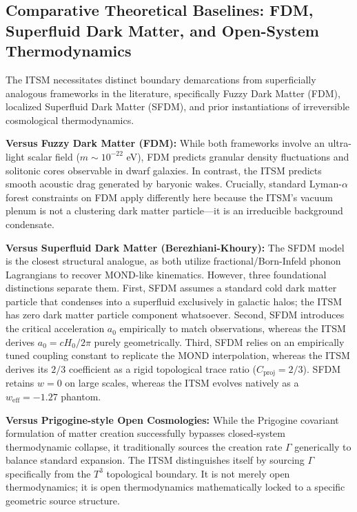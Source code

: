 \documentclass[aps,prd,10pt,twocolumn,superscriptaddress,nofootinbib,floatfix]{revtex4-2}
\begin{document}
\subsection{Comparative Theoretical Baselines: FDM, Superfluid Dark Matter, and Open-System Thermodynamics}

The ITSM necessitates distinct boundary demarcations from superficially analogous frameworks in the literature, specifically Fuzzy Dark Matter (FDM), localized Superfluid Dark Matter (SFDM), and prior instantiations of irreversible cosmological thermodynamics.

\textbf{Versus Fuzzy Dark Matter (FDM):} While both frameworks involve an ultra-light scalar field ($m \sim 10^{-22}$ eV), FDM predicts granular density fluctuations and solitonic cores observable in dwarf galaxies. In contrast, the ITSM predicts smooth acoustic drag generated by baryonic wakes. Crucially, standard Lyman-$\alpha$ forest constraints on FDM apply differently here because the ITSM's vacuum plenum is not a clustering dark matter particle---it is an irreducible background condensate. 

\textbf{Versus Superfluid Dark Matter (Berezhiani-Khoury):} The SFDM model \cite{sf_dm} is the closest structural analogue, as both utilize fractional/Born-Infeld phonon Lagrangians to recover MOND-like kinematics. However, three foundational distinctions separate them. First, SFDM assumes a standard cold dark matter particle that condenses into a superfluid exclusively in galactic halos; the ITSM has zero dark matter particle component whatsoever. Second, SFDM introduces the critical acceleration $a_0$ empirically to match observations, whereas the ITSM derives $a_0 = c H_0 / 2\pi$ purely geometrically. Third, SFDM relies on an empirically tuned coupling constant to replicate the MOND interpolation, whereas the ITSM derives its $2/3$ coefficient as a rigid topological trace ratio ($C_{\text{proj}} = 2/3$). SFDM retains $w=0$ on large scales, whereas the ITSM evolves natively as a $w_{\text{eff}}=-1.27$ phantom.

\textbf{Versus Prigogine-style Open Cosmologies:} While the Prigogine covariant formulation of matter creation successfully bypasses closed-system thermodynamic collapse, it traditionally sources the creation rate $\Gamma$ generically to balance standard expansion. The ITSM distinguishes itself by sourcing $\Gamma$ specifically from the $T^3$ topological boundary. It is not merely open thermodynamics; it is open thermodynamics mathematically locked to a specific geometric source structure.
\end{document}
